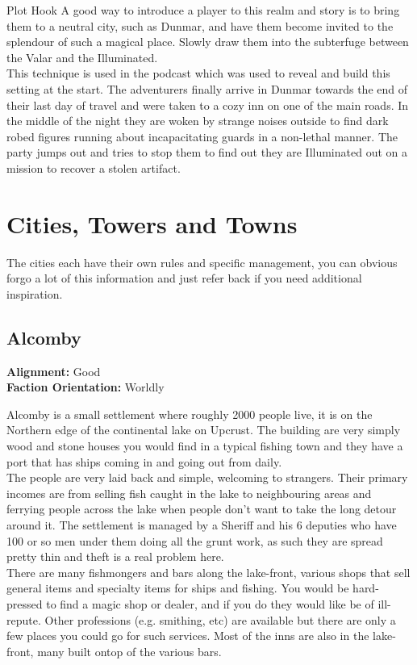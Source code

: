 \documentclass[10pt,twoside,twocolumn]{article}
\begin{document}
\begin{paperbox}{Plot Hook}
A good way to introduce a player to this realm and story is to bring them to a neutral city, such as Dunmar, and have them become invited to the splendour of such a magical place. Slowly draw them into the subterfuge between the Valar and the Illuminated.\\

This technique is used in the podcast which was used to reveal and build this setting at the start. The adventurers finally arrive in Dunmar towards the end of their last day of travel and were taken to a cozy inn on one of the main roads. In the middle of the night they are woken by strange noises outside to find dark robed figures running about incapacitating guards in a non-lethal manner. The party jumps out and tries to stop them to find out they are Illuminated out on a mission to recover a stolen artifact.\\
\end{paperbox}

\section{Cities, Towers and Towns}

The cities each have their own rules and specific management, you can obvious forgo a lot of this information and just refer back if you need additional inspiration. \\

\subsection{Alcomby}
\textbf{Alignment:} Good \\
\textbf{Faction Orientation:} Worldly \\
\begin{quotebox}
	Alcomby is a small settlement where roughly 2000 people live, it is on the Northern edge of the continental lake on Upcrust. The building are very simply wood and stone houses you would find in a typical fishing town and they have a port that has ships coming in and going out from daily.\\

	The people are very laid back and simple, welcoming to strangers. Their primary incomes are from selling fish caught in the lake to neighbouring areas and ferrying people across the lake when people don't want to take the long detour around it. The settlement is managed by a Sheriff and his 6 deputies who have 100 or so men under them doing all the grunt work, as such they are spread pretty thin and theft is a real problem here.\\

	There are many fishmongers and bars along the lake-front, various shops that sell general items and specialty items for ships and fishing. You would be hard-pressed to find a magic shop or dealer, and if you do they would like be of ill-repute. Other professions (e.g. smithing, etc) are available but there are only a few places you could go for such services. Most of the inns are also in the lake-front, many built ontop of the various bars.
\end{quotebox}
\end{document}
